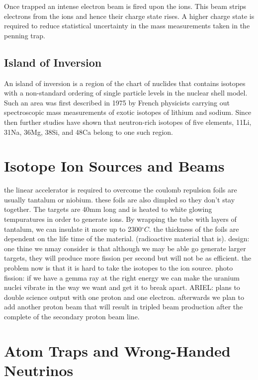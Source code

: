\documentclass[english, 11pt]{article}
\begin{document}
Once trapped an intense electron beam is fired upon the ions. This beam strips electrons from the ions and hence their charge state rises. A higher charge state is required to reduce statistical uncertainty in the mass measurements taken in the penning trap.

\subsection{Island of Inversion}

An island of inversion is a region of the chart of nuclides that contains isotopes with a non-standard ordering of single particle levels in the nuclear shell model. Such an area was first described in 1975 by French physicists carrying out spectroscopic mass measurements of exotic isotopes of lithium and sodium. Since then further studies have shown that neutron-rich isotopes of five elements, 11Li, 31Na, 36Mg, 38Si, and 48Ca belong to one such region.

\section{Isotope Ion Sources and Beams}
the linear accelerator is required to overcome the coulomb repulsion
foils are usually tantalum or niobium. these foils are also dimpled so they don't stay together. The targets are
40mm long and is heated to white glowing tempuratures in order to generate ions. By wrapping the tube with layers of tantalum, we can insulate it more up to 2300$^\circ C$.
the thickness of the foils are dependent on the life time of the material. (radioactive material that is). design:
one thine we nmay consider is that although we may be able go generate larger targets, they will produce more
fission per second but will not be as efficient. the problem now is that it is hard to take the isotopes to the ion source. photo fission: if we have a gemma ray at the right energy we can make the uranium nuclei vibrate in the way we want and get it to break apart.
ARIEL: plans to double science output with one proton and one electron. afterwards we plan to add another proton beam that will result in tripled beam production after the complete of the secondary proton beam line.


\section{Atom Traps and Wrong-Handed Neutrinos}
\end{document}
